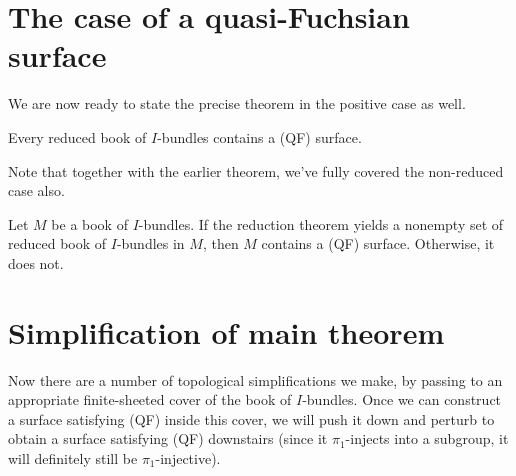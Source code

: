\section{The case of a quasi-Fuchsian surface}

We are now ready to state the precise theorem in the positive case as well.

\begin{thm}

Every reduced book of $I$-bundles contains a (QF) surface.

\end{thm}

Note that together with the earlier theorem, we've fully covered the
non-reduced case also.

\begin{thm}

Let $M$ be a book of $I$-bundles. If the reduction theorem yields a nonempty
set of reduced book of $I$-bundles in $M$, then $M$ contains a (QF) surface.
Otherwise, it does not.

\end{thm}

\section{Simplification of main theorem}

Now there are a number of topological simplifications we make, by passing to an
appropriate finite-sheeted cover of the book of $I$-bundles.  Once we can
construct a surface satisfying (QF) inside this cover, we will push it down and
perturb to obtain a surface satisfying (QF) downstairs (since it
$\pi_1$-injects into a subgroup, it will definitely still be
$\pi_1$-injective).


